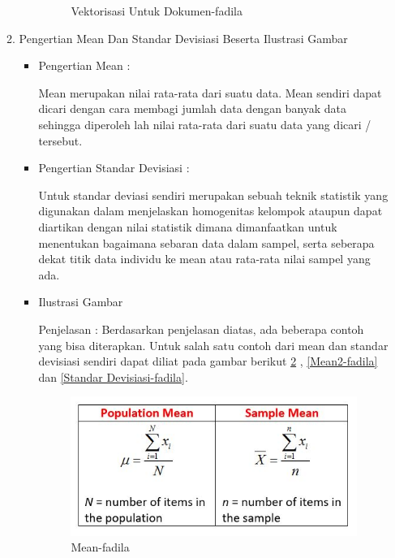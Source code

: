 \begin{enumerate}
\begin{enumerate}
\begin{itemize}
\begin{figure}[!hbtp]
\caption{Vektorisasi Untuk Dokumen-fadila}
\label{Vektorisasi Untuk Dokumen-fadila}
\end{figure}
\par
\end{itemize}
\par
\par
\item Pengertian Mean Dan Standar Devisiasi Beserta Ilustrasi Gambar
\begin{itemize}
\item  Pengertian Mean :
\par Mean merupakan nilai rata-rata dari suatu data. Mean sendiri dapat dicari dengan cara membagi jumlah data dengan banyak data sehingga diperoleh lah nilai rata-rata dari suatu data yang dicari / tersebut. 
\par
\par
\item  Pengertian Standar Devisiasi :
\par Untuk standar deviasi sendiri merupakan sebuah teknik statistik yang digunakan dalam menjelaskan homogenitas kelompok ataupun dapat diartikan dengan nilai statistik dimana dimanfaatkan untuk menentukan bagaimana sebaran data dalam sampel, serta seberapa dekat titik data individu ke mean atau rata-rata nilai sampel yang ada. 
\par
\par
\item Ilustrasi Gambar
\par Penjelasan : Berdasarkan penjelasan diatas, ada beberapa contoh yang bisa diterapkan. Untuk salah satu contoh dari mean dan standar devisiasi sendiri dapat diliat pada gambar berikut \ref{Mean-fadila} , \ref{Mean2-fadila}  dan \ref{Standar Devisiasi-fadila}.
\begin{figure}[!hbtp]
\centering
\includegraphics[scale=0.17]{figures/mean-fadila.jpg}
\caption{Mean-fadila}
\label{Mean-fadila}
\end{figure}

\end{itemize}
\end{enumerate}
\end{enumerate}
